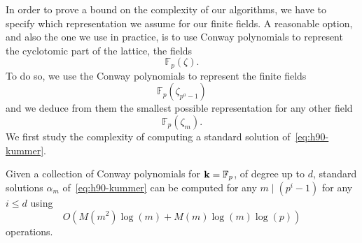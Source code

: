 In order to prove a bound on the complexity of our algorithms, we have to
specify which representation we assume for our finite fields. A reasonable
option, and also the one we use in practice, is to use Conway polynomials to
represent the cyclotomic part of the lattice, \ie the fields
\[
  \mathbb{F}_p(\zeta).
\]
To do so, we use the Conway polynomials to represent the finite fields
\[
  \mathbb{F}_p(\zeta_{p^a-1})
\]
and we deduce from them the smallest possible representation for any other field
\[
  \mathbb{F}_p(\zeta_m).
\]
We first study the complexity of computing a standard solution
of~\eqref{eq:h90-kummer}.
\begin{prop}
\label{prop:complexity-h90}
Given a collection of Conway polynomials for $\mathbf{k}=\mathbb{F}_p$, of degree up to
$d$, standard solutions $\alpha_m$ of~\eqref{eq:h90-kummer} can be computed
for any $m\mid(p^i-1)$ for any $i\leq d$ using
\[
  O(M(m^2)\log(m)+M(m)\log(m)\log(p))
\]
operations. 
\end{prop}
